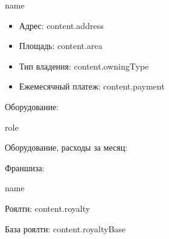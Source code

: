 \documentclass[a4paper,12pt]{article}
\begin{document}
{{{{{{{{{{{{{{{%
  {%
    {{ name }}

    \begin{itemize}
    \item Адрес: {{ content.address }}
    \item Площадь: {{ content.area }}
    \item Тип владения: {{ content.owningType }}
    \item Ежемесячный платеж: {{ content.payment }}
    \end{itemize}
    {%
    Оборудование:
    {%
    {%
      {%
      {{ role }}
        {%
        {%
      {%
    {%

    {%
    Оборудование, расходы за месяц:

    {%
    {%
    {%
    {%
    {%
  {%
{%

{%
Франшиза:
  {%
      {{ name }}

      Роялти: {{ content.royalty }}
      
      База роялти: {{ content.royaltyBase }}
      
}}}}}}}}}}}}}}}}}}}}}}}}}}}}}}}}}}
\end{document}
